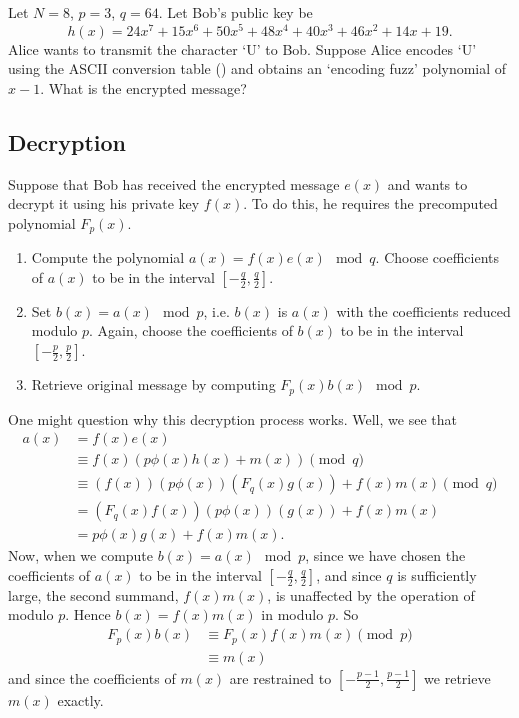 \begin{exercise}
    Let $N = 8$, $p = 3$, $q = 64$. Let Bob's public key be
    \[
        h(x) = 24x^7 + 15x^6 + 50x^5 + 48x^4 + 40x^3 + 46x^2 + 14x + 19.
    \]
    Alice wants to transmit the character `U' to Bob. Suppose Alice encodes `U' using the ASCII conversion table () and obtains an `encoding fuzz' polynomial of $x - 1$. What is the encrypted message?
\end{exercise}

\subsection{Decryption}
Suppose that Bob has received the encrypted message $e(x)$ and wants to decrypt it using his private key $f(x)$. To do this, he requires the precomputed polynomial $F_p(x)$.
\begin{enumerate}
    \item Compute the polynomial $a(x) = f(x)e(x) \mod q$. Choose coefficients of $a(x)$ to be in the interval $\left[-\frac q2, \frac q2\right]$.
    \item Set $b(x) = a(x) \mod p$, i.e. $b(x)$ is $a(x)$ with the coefficients reduced modulo $p$. Again, choose the coefficients of $b(x)$ to be in the interval $\left[-\frac p2, \frac p2\right]$.
    \item Retrieve original message by computing $F_p(x)b(x) \mod p$.
\end{enumerate}

One might question why this decryption process works. Well, we see that
\begin{align*}
    a(x) &= f(x)e(x)\\
    &\equiv f(x) \left(p\phi(x)h(x) + m(x)\right) \pmod q\\
    &\equiv (f(x))(p\phi(x))(F_q(x)g(x)) + f(x)m(x) \pmod q\\
    &= (F_q(x)f(x))(p\phi(x))(g(x)) + f(x)m(x)\\
    &= p\phi(x)g(x) + f(x)m(x).
\end{align*}
Now, when we compute $b(x) = a(x) \mod p$, since we have chosen the coefficients of $a(x)$ to be in the interval $\left[-\frac q2, \frac q2\right]$, and since $q$ is sufficiently large, the second summand, $f(x)m(x)$, is unaffected by the operation of modulo $p$. Hence $b(x) = f(x)m(x)$ in modulo $p$. So
\begin{align*}
    F_p(x)b(x) &\equiv F_p(x)f(x)m(x) \pmod{p}\\
    &\equiv m(x)
\end{align*}
and since the coefficients of $m(x)$ are restrained to $\left[-\frac{p-1}2, \frac{p-1}2\right]$ we retrieve $m(x)$ exactly.

